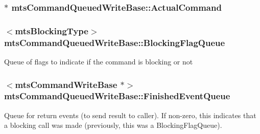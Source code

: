 \subsubsection[{Actual\+Command}]{$\ast$ mts\+Command\+Queued\+Write\+Base\+::\+Actual\+Command\hspace{0.3cm}{\ttfamily [protected]}}\label{classmts_command_queued_write_base_a0b7c5cdfff1c742e84796cf3f80bbd68}
\hypertarget{classmts_command_queued_write_base_a8aba2d8465fe58370e4058b9b4998621}{}
\subsubsection[{Blocking\+Flag\+Queue}]{$<${\bf mts\+Blocking\+Type}$>$ mts\+Command\+Queued\+Write\+Base\+::\+Blocking\+Flag\+Queue\hspace{0.3cm}{\ttfamily [protected]}}\label{classmts_command_queued_write_base_a8aba2d8465fe58370e4058b9b4998621}
Queue of flags to indicate if the command is blocking or not \hypertarget{classmts_command_queued_write_base_a67c11afa021916f995d1d537312c9a4c}{}
\subsubsection[{Finished\+Event\+Queue}]{$<${\bf mts\+Command\+Write\+Base} $\ast$$>$ mts\+Command\+Queued\+Write\+Base\+::\+Finished\+Event\+Queue\hspace{0.3cm}{\ttfamily [protected]}}\label{classmts_command_queued_write_base_a67c11afa021916f995d1d537312c9a4c}
Queue for return events (to send result to caller). If non-\/zero, this indicates that a blocking call was made (previously, this was a Blocking\+Flag\+Queue). \hypertarget{classmts_command_queued_write_base_aff12f0b8e184ae4891388a5c0c647724}{}
